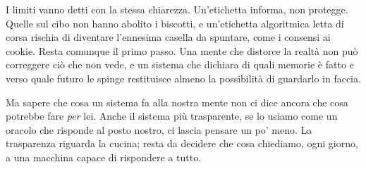 I limiti vanno detti con la stessa chiarezza. Un'etichetta informa, non protegge. Quelle sul cibo non hanno abolito i biscotti, e un'etichetta algoritmica letta di corsa rischia di diventare l'ennesima casella da spuntare, come i consensi ai cookie. Resta comunque il primo passo. Una mente che distorce la realtà non può correggere ciò che non vede, e un sistema che dichiara di quali memorie è fatto e verso quale futuro le spinge restituisce almeno la possibilità di guardarlo in faccia.

Ma sapere che cosa un sistema fa alla nostra mente non ci dice ancora che cosa potrebbe fare \textit{per} lei. Anche il sistema più trasparente, se lo usiamo come un oracolo che risponde al posto nostro, ci lascia pensare un po' meno. La trasparenza riguarda la cucina; resta da decidere che cosa chiediamo, ogni giorno, a una macchina capace di rispondere a tutto.
